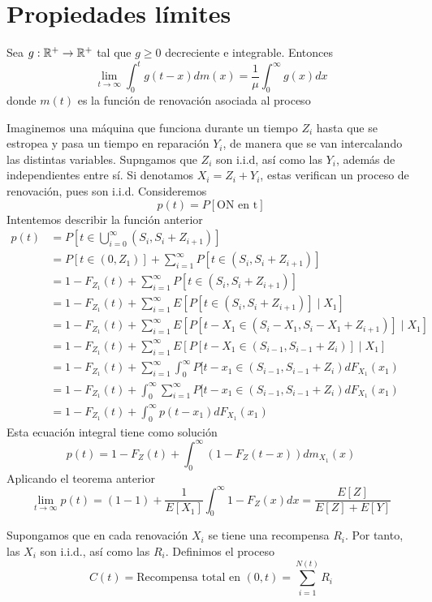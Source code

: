 \documentclass[PREyA.tex]{subfiles}
\begin{document}
\newpage


\section{Propiedades límites}
\begin{theorem} Sea $g:\mathbb{R}^+\to\mathbb{R}^+$ tal que $g\geq 0$ decreciente e integrable. Entonces
$$
\lim_{t\to\infty}\int_0^t g(t-x)dm(x) = \frac{1}{\mu}\int_0^\infty g(x)dx
$$
donde $m(t)$ es la función de renovación asociada al proceso
\end{theorem}
\begin{example} Imaginemos una máquina que funciona durante un tiempo $Z_i$ hasta que se estropea y pasa un tiempo en reparación $Y_i$, de manera que se van intercalando las distintas variables. Supngamos que $Z_i$ son i.i.d, así como las $Y_i$, además de independientes entre sí. Si denotamos $X_i = Z_i + Y_i$, estas verifican un proceso de renovación, pues son i.i.d. Consideremos 
$$
p(t)=P[\text{ON en t}]
$$ 
Intentemos describir la función anterior
\begin{align*}
p(t)&=P\left[t\in \bigcup_{i=0}^\infty (S_i,S_i+Z_{i+1})\right]\\
&=P[t\in(0,Z_1)] + \sum_{i=1}^\infty P[t\in (S_i,S_i+Z_{i+1})]\\
&= 1-F_{Z_1}(t) + \sum_{i=1}^\infty P[t\in (S_i,S_i+Z_{i+1})]\\
&= 1-F_{Z_1}(t) + \sum_{i=1}^\infty E[P[t\in (S_i,S_i+Z_{i+1})]\mid X_1]\\
&= 1-F_{Z_1}(t) + \sum_{i=1}^\infty E[P[t-X_1\in (S_i-X_1,S_i-X_1+Z_{i+1})]\mid X_1]\\
&= 1-F_{Z_1}(t) + \sum_{i=1}^\infty E[P[t-X_1\in (S_{i-1},S_{i-1}+Z_{i})]\mid X_1]\\
&=1-F_{Z_1}(t) + \sum_{i=1}^\infty \int_0^\infty P[t-x_1 \in (S_{i-1},S_{i-1}+Z_i)dF_{X_1}(x_1)\\
&=1-F_{Z_1}(t) + \int_0^\infty  \sum_{i=1}^\infty P[t-x_1 \in (S_{i-1},S_{i-1}+Z_i)dF_{X_1}(x_1)\\
&=1-F_{Z_1}(t) + \int_0^\infty p(t-x_1)dF_{X_1}(x_1)
\end{align*}
Esta ecuación integral tiene como solución
$$
p(t)=1-F_Z(t) + \int_0^\infty (1-F_Z(t-x))dm_{X_1}(x)
$$
Aplicando el teorema anterior
$$
\lim_{t\to \infty} p(t) = (1-1) + \frac{1}{E[X_1]}\int_0^\infty 1-F_Z(x)dx = \frac{E[Z]}{E[Z]+E[Y]}
$$

\end{example}
\begin{example}
Supongamos que en cada renovación $X_i$ se tiene una recompensa $R_i$. Por tanto, las $X_i$ son i.i.d., así como las $R_i$. Definimos el proceso
$$
C(t)=\text{Recompensa total en $(0,t)$} = \sum_{i=1}^{N(t)}R_i
$$
\end{example}
\newpage
\end{document}
